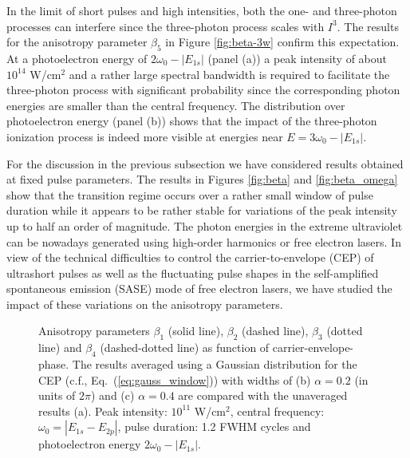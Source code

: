 In the limit of short pulses and high intensities, both the one- and three-photon processes can interfere since the three-photon process scales with $I^3$. The results for the anisotropy parameter $\beta_5$ in Figure \ref{fig:beta-3w} confirm this expectation. At a photoelectron energy of $2\omega_0 - |E_{1s}|$ (panel (a)) a peak intensity of about $10^{14}$ W/cm$^2$ and a rather large spectral bandwidth is required to facilitate the three-photon process with significant probability since the corresponding photon energies are smaller than the central frequency. The distribution over photoelectron energy (panel (b)) shows that the impact of the three-photon ionization process is indeed more visible at energies near $E = 3\omega_0 - |E_{1s}|$.


For the discussion in the previous subsection we have considered results obtained at fixed pulse parameters. The results in Figures \ref{fig:beta} and \ref{fig:beta_omega} show that the transition regime occurs over a rather small window of pulse duration while it appears to be rather stable for variations of the peak intensity up to half an order of magnitude. The photon energies in the extreme ultraviolet can be nowadays generated using high-order harmonics or free electron lasers. In view of the technical difficulties to control the carrier-to-envelope (CEP) of ultrashort pulses as well as the fluctuating pulse shapes in the self-amplified spontaneous emission (SASE) mode of free electron lasers, we have studied the impact of these variations on the anisotropy parameters. 

\begin{figure}[t]
\centering
\caption{
Anisotropy parameters $\beta_1$ (solid line), $\beta_2$ (dashed line), $\beta_3$ (dotted line) and $\beta_4$ (dashed-dotted line) as function of carrier-envelope-phase. The results averaged using a Gaussian distribution for the CEP (c.f., Eq.\ (\ref{eq:gauss_window})) with widths of (b) $\alpha = 0.2$ (in units of $2\pi$) and (c) $\alpha = 0.4$ are compared with the unaveraged results (a). Peak intensity: $10^{11}$ W/cm$^2$, central frequency:  $\omega_0 = |E_{1s}-E_{2p}|$, pulse duration: 1.2 FWHM cycles and photoelectron energy $2\omega_0 - |E_{1s}|$.
} 
  \label{fig:beta_cep}
\end{figure}


